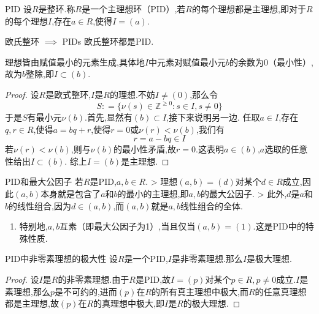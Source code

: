 \documentclass[lang=cn,12pt,color=green,fontset=none,pad]{elegantbook}
\begin{document}
\begin{definition}{PID}
    设$R$是整环.称$R$是一个主理想环（PID）,若$R$的每个理想都是主理想,即对于$R$的每个理想$I$,存在$a \in R$,使得$I=\left( a \right)$.
\end{definition}

\begin{theorem}{欧氏整环 $ \implies $ PIDs }\label{thm:E.D is a PID}
    欧氏整环都是PID.
\end{theorem}
\begin{note}
    理想皆由赋值最小的元素生成,具体地$I$中元素对赋值最小元$b$的余数为$0$（最小性）,故为$b$整除,即$I\subset \left( b \right)$.
\end{note}

\begin{proof}
    设$R$是欧式整环,$I$是$R$的理想.不妨$I \neq \left( 0 \right)$,那么令 $$ S : = \{  \nu\left( s \right) \in \mathbb{Z}^{\geqslant  0}: s  \in I,s \neq 0\} $$于是$S$有最小元$\nu \left( b \right)$.首先,显然有$\left( b \right)\subset I$,接下来说明另一边.
任取$a \in I$,存在$q,r \in R$,使得$a=bq+r$,使得$r=0$或$\nu \left( r \right)< \nu \left( b \right)$,我们有 $$ r=a-bq \in I $$若$\nu \left( r \right)< \nu \left( b \right)$,则与$\nu \left( b \right)$的最小性矛盾,故$r=0$.这表明$a \in \left( b \right)$,$a$选取的任意性给出$I\subset \left( b \right)$.
综上$I=\left( b \right)$是主理想.

\end{proof}

\begin{proposition}{PID和最大公因子}
    若$R$是PID,$a,b \in R$.
> 理想$\left( a,b \right)=\left( d \right)$对某个$d \in R$成立,因此$\left( a,b \right)$本身就是包含了$a$和$b$的最小的主理想,即$a,b$的最大公因子.
> 此外,$d$是$a$和$b$的线性组合,因为$d \in \left( a,b \right)$,而$\left( a,b \right)$就是$a,b$线性组合的全体.
\end{proposition}

\begin{remark}
    \begin{enumerate}
        \item 特别地,$a,b$互素（即最大公因子为1）,当且仅当$\left( a,b \right)=\left( 1 \right)$.这是PID中的特殊性质.
    \end{enumerate}
    
\end{remark}

\begin{proposition}{PID中非零素理想的极大性}\label{pro:PID-prime-to-maximal}
    设$R$是一个PID,$I$是非零素理想.那么$I$是极大理想.    
\end{proposition}
\begin{proof}
    设$I$是$R$的非零素理想.由于$R$是PID,故$I=\left( p \right)$对某个$p \in R,p \neq 0$成立.$I$是素理想,那么$p$是不可约的,进而$\left( p \right)$在$R$的所有真主理想中极大,而$R$的任意真理想都是主理想,故$\left( p \right)$在$R$的真理想中极大,即$I$是$R$的极大理想.

\end{proof}
\end{document}
